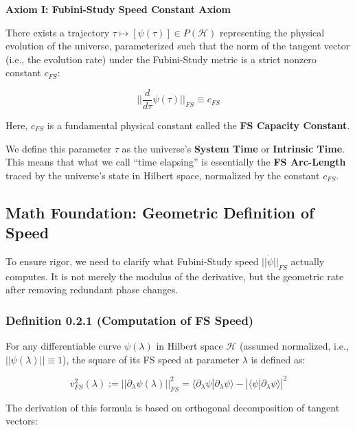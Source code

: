 \textbf{Axiom I: Fubini-Study Speed Constant Axiom}

There exists a trajectory \textbf{$\tau \mapsto [\psi(\tau)] \in P(\mathcal{H})$} representing the physical evolution of the universe, parameterized such that the norm of the tangent vector (i.e., the evolution rate) under the Fubini-Study metric is a strict nonzero constant \textbf{$c_{FS}$}:

$$||\frac{d}{d\tau}\psi(\tau)||_{FS} \equiv c_{FS}$$

Here, \textbf{$c_{FS}$} is a fundamental physical constant called the \textbf{FS Capacity Constant}.

We define this parameter \textbf{$\tau$} as the universe's \textbf{System Time} or \textbf{Intrinsic Time}. This means that what we call ``time elapsing'' is essentially the \textbf{FS Arc-Length} traced by the universe's state in Hilbert space, normalized by the constant \textbf{$c_{FS}$}.

\subsection{Math Foundation: Geometric Definition of Speed}

To ensure rigor, we need to clarify what Fubini-Study speed \textbf{$||\dot{\psi}||_{FS}$} actually computes. It is not merely the modulus of the derivative, but the geometric rate after removing redundant phase changes.

\subsubsection{Definition 0.2.1 (Computation of FS Speed)}

For any differentiable curve \textbf{$\psi(\lambda)$} in Hilbert space \textbf{$\mathcal{H}$} (assumed normalized, i.e., \textbf{$||\psi(\lambda)|| \equiv 1$}), the square of its FS speed at parameter \textbf{$\lambda$} is defined as:

$$v_{FS}^2(\lambda) := ||\partial_{\lambda}\psi(\lambda)||_{FS}^2 = \langle \partial_{\lambda}\psi | \partial_{\lambda}\psi \rangle - |\langle \psi | \partial_{\lambda}\psi \rangle|^2$$

The derivation of this formula is based on orthogonal decomposition of tangent vectors:

